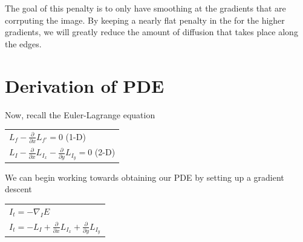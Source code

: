 \documentclass{article}
\begin{document}
  \noindent
  The goal of this penalty is to only have smoothing at the gradients
  that are corrputing the image. By keeping a nearly flat penalty in the for
  the higher gradients, we will greatly reduce the amount of diffusion that
  takes place along the edges.




  \newpage
  \section{Derivation of PDE}

    \noindent Now, recall the Euler-Lagrange equation
      \begin{center}
        \begin{tabular}{l}
          \vspace{12pt}
          $L_{f} - \frac{\partial}{\partial x}L_{f'} = 0$ (1-D)\\
          $L_{I} - \frac{\partial}{\partial x}L_{I_{x}} - \frac{\partial}{\partial y}L_{I_{y}} = 0$ (2-D)\\
        \end{tabular}
      \end{center}
    \vspace{12pt}

    \noindent
    We can begin working towards obtaining our PDE by setting up a gradient descent
      \begin{center}
        \begin{tabular}{l}
          \vspace{12pt}
          $I_{t} = -\nabla_{I}E$\\
          $I_{t} = -L_{I} + \frac{\partial}{\partial x}L_{I_{x}} + \frac{\partial}{\partial y}L_{I_{y}}$
        \end{tabular}
      \end{center}
    \vspace{12pt}
\end{document}
